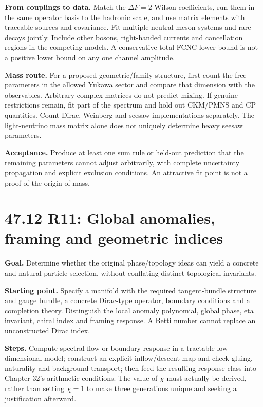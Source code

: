 \documentclass[
  11pt,
  oneside]{book}
\begin{document}
\textbf{From couplings to data.} Match the \(\Delta F=2\) Wilson
coefficients, run them in the same operator basis to the hadronic scale,
and use matrix elements with traceable sources and covariance. Fit
multiple neutral-meson systems and rare decays jointly. Include other
bosons, right-handed currents and cancellation regions in the competing
models. A conservative total FCNC lower bound is not a positive lower
bound on any one channel amplitude.

\textbf{Mass route.} For a proposed geometric/family structure, first
count the free parameters in the allowed Yukawa sector and compare that
dimension with the observables. Arbitrary complex matrices do not
predict mixing. If genuine restrictions remain, fit part of the spectrum
and hold out CKM/PMNS and CP quantities. Count Dirac, Weinberg and
seesaw implementations separately. The light-neutrino mass matrix alone
does not uniquely determine heavy seesaw parameters.

\textbf{Acceptance.} Produce at least one sum rule or held-out
prediction that the remaining parameters cannot adjust arbitrarily, with
complete uncertainty propagation and explicit exclusion conditions. An
attractive fit point is not a proof of the origin of mass.

\section{47.12 R11: Global anomalies, framing and geometric indices}

\textbf{Goal.} Determine whether the original phase/topology ideas can
yield a concrete and natural particle selection, without conflating
distinct topological invariants.

\textbf{Starting point.} Specify a manifold with the required
tangent-bundle structure and gauge bundle, a concrete Dirac-type
operator, boundary conditions and a completion theory. Distinguish the
local anomaly polynomial, global phase, eta invariant, chiral index and
framing response. A Betti number cannot replace an unconstructed Dirac
index.

\textbf{Steps.} Compute spectral flow or boundary response in a
tractable low-dimensional model; construct an explicit inflow/descent
map and check gluing, naturality and background transport; then feed the
resulting response class into Chapter 32's arithmetic conditions. The
value of \(\chi\) must actually be derived, rather than setting
\(\chi=1\) to make three generations unique and seeking a justification
afterward.
\end{document}
